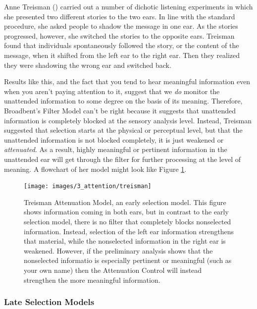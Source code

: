 \documentclass[
]{krantz}
\begin{document}
Anne Treisman () carried out a number of dichotic listening experiments in which she presented two different stories to the two ears. In line with the standard procedure, she asked people to shadow the message in one ear. As the stories progressed, however, she switched the stories to the opposite ears. Treisman found that individuals spontaneously followed the story, or the content of the message, when it shifted from the left ear to the right ear. Then they realized they were shadowing the wrong ear and switched back.

Results like this, and the fact that you tend to hear meaningful information even when you aren't paying attention to it, suggest that we \emph{do} monitor the unattended information to some degree on the basis of its meaning. Therefore, Broadbent's Filter Model can't be right because it suggests that unattended information is completely blocked at the sensory analysis level. Instead, Treisman suggested that selection starts at the physical or perceptual level, but that the unattended information is not blocked completely, it is just weakened or \emph{attenuated}. As a result, highly meaningful or pertinent information in the unattended ear will get through the filter for further processing at the level of meaning. A flowchart of her model might look like Figure \ref{fig:treisman}.

\begin{figure}

{\centering \texttt{[image: images/3\_attention/treisman]} 

}

\caption{Treisman Attenuation Model, an early selection model. This figure shows information coming in both ears, but in contrast to the early selection model, there is no filter that completely blocks nonselected information. Instead, selection of the left ear information strengthens that material, while the nonselected information in the right ear is weakened. However, if the preliminary analysis shows that the nonselected informatio is especially pertinent or meaningful (such as your own name) then the Attenuation Control will instead strengthen the more meaningful information.}\label{fig:treisman}
\end{figure}

\subsubsection*{Late Selection Models}\label{late-selection-models}
\end{document}
